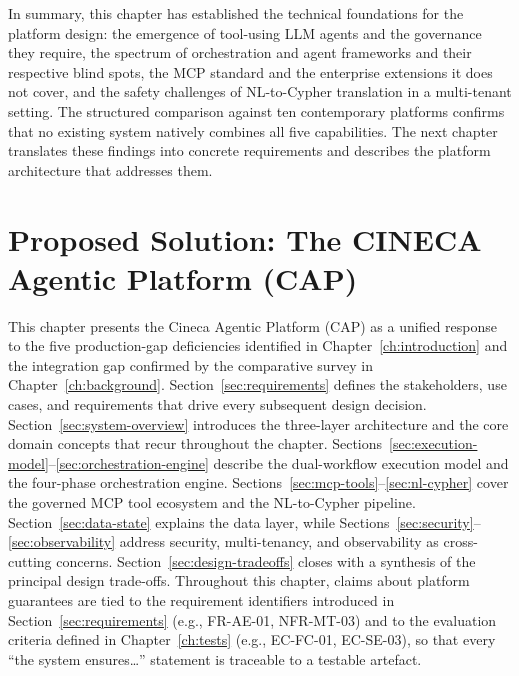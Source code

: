 \documentclass[a4paper]{sapthesis}
\begin{document}
\bigskip
\noindent
In summary, this chapter has established the technical foundations for the
platform design: the emergence of tool-using LLM agents and the governance
they require, the spectrum of orchestration and agent frameworks and their
respective blind spots, the MCP standard and the enterprise extensions it
does not cover, and the safety challenges of NL-to-Cypher translation in a
multi-tenant setting.  The structured comparison against ten contemporary
platforms confirms that no existing system natively combines all five
capabilities.  The next chapter translates these findings into concrete
requirements and describes the platform architecture that addresses them.


\chapter{Proposed Solution: The CINECA Agentic Platform (CAP)}
\label{ch:proposed-solution}

This chapter presents the Cineca Agentic Platform (CAP) as a unified
response to the five production-gap deficiencies identified in
Chapter~\ref{ch:introduction} and the integration gap confirmed by the
comparative survey in Chapter~\ref{ch:background}.
Section~\ref{sec:requirements} defines the stakeholders, use cases, and
requirements that drive every subsequent design decision.
Section~\ref{sec:system-overview} introduces the three-layer architecture
and the core domain concepts that recur throughout the chapter.
Sections~\ref{sec:execution-model}--\ref{sec:orchestration-engine} describe
the dual-workflow execution model and the four-phase orchestration engine.
Sections~\ref{sec:mcp-tools}--\ref{sec:nl-cypher} cover the governed MCP
tool ecosystem and the NL-to-Cypher pipeline.
Section~\ref{sec:data-state} explains the data layer, while
Sections~\ref{sec:security}--\ref{sec:observability} address security,
multi-tenancy, and observability as cross-cutting concerns.
Section~\ref{sec:design-tradeoffs} closes with a synthesis of the
principal design trade-offs.  Throughout this chapter, claims about
platform guarantees are tied to the requirement identifiers
introduced in Section~\ref{sec:requirements} (e.g., FR-AE-01, NFR-MT-03)
and to the evaluation criteria defined in Chapter~\ref{ch:tests} (e.g.,
EC-FC-01, EC-SE-03), so that every ``the system ensures\ldots'' statement
is traceable to a testable artefact.
\end{document}
